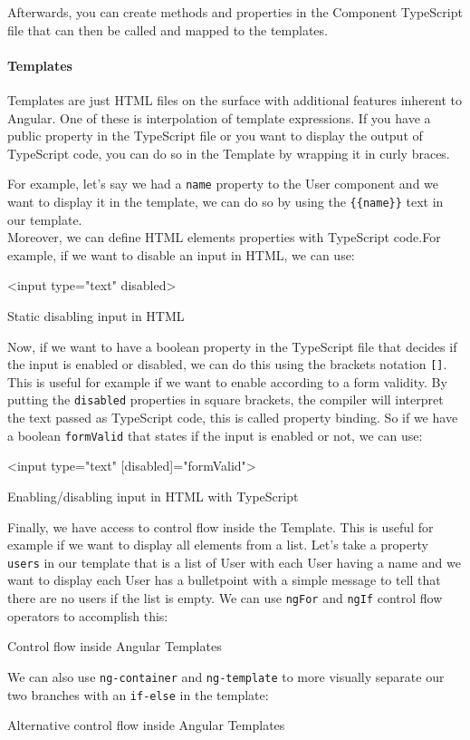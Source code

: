 \documentclass[11pt,a4paper]{report}
\newenvironment{code}{\captionsetup{type=listing}}{}
\begin{document}
Afterwards, you can create methods and properties in the Component TypeScript file that can then be called and mapped to the templates. 
\paragraph{Templates}
Templates\cite{angular:doc:templates} are just HTML files on the surface with additional features inherent to Angular. One of these is interpolation of template expressions. If you have a public property in the TypeScript file or you want to display the output of TypeScript code, you can do so in the Template by wrapping it in curly braces.

For example, let's say we had a \verb+name+ property to the User component and we want to display it in the template, we can do so by using the \verb+{{name}}+ text in our template.\\

Moreover, we can define HTML elements properties with TypeScript code.For example, if we want to disable an input in HTML, we can use:
\begin{code}
\begin{inlinehtml}
<input type="text" disabled>
\end{inlinehtml}
\caption{Static disabling input in HTML}	
\end{code}
Now, if we want to have a boolean property in the TypeScript file that decides if the input is enabled or disabled, we can do this using the brackets notation \verb+[]+. This is useful for example if we want to enable according to a form validity. By putting the \verb+disabled+ properties in square brackets, the compiler will interpret the text passed as TypeScript code, this is called property binding. So if we have a boolean \verb+formValid+ that states if the input is enabled or not, we can use:
\begin{code}
\begin{inlinehtml}
<input type="text" [disabled]="formValid">
\end{inlinehtml}
\caption{Enabling/disabling input in HTML with TypeScript}	
\end{code}

Finally, we have access to control flow inside the Template. This is useful for example if we want to display all elements from a list. Let's take a property \verb+users+ in our template that is a list of User with each User having a name and we want to display each User has a bulletpoint with a simple message to tell that there are no users if the list is empty. We can use \verb+ngFor+ and \verb+ngIf+ control flow operators to accomplish this:
\begin{code}
	\caption{Control flow inside Angular Templates}
\end{code}
We can also use \verb+ng-container+ and \verb+ng-template+ to more visually separate our two branches with an \verb+if-else+ in the template:
\begin{code}
	\caption{Alternative control flow inside Angular Templates}
\end{code}
\end{document}
